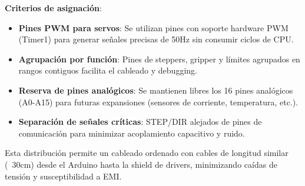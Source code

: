 \textbf{Criterios de asignación}:

\begin{itemize}
    \item \textbf{Pines PWM para servos}: Se utilizan pines con soporte hardware PWM (Timer1) para generar señales precisas de 50Hz sin consumir ciclos de CPU.
    \item \textbf{Agrupación por función}: Pines de steppers, gripper y límites agrupados en rangos contiguos facilita el cableado y debugging.
    \item \textbf{Reserva de pines analógicos}: Se mantienen libres los 16 pines analógicos (A0-A15) para futuras expansiones (sensores de corriente, temperatura, etc.).
    \item \textbf{Separación de señales críticas}: STEP/DIR alejados de pines de comunicación para minimizar acoplamiento capacitivo y ruido.
\end{itemize}

Esta distribución permite un cableado ordenado con cables de longitud similar (~30cm) desde el Arduino hasta la shield de drivers, minimizando caídas de tensión y susceptibilidad a EMI.
